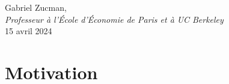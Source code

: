 \documentclass[a5paper,french,openany]{memoir}
\begin{document}
\begin{flushright}
Gabriel Zucman,\\
\textit{Professeur à l'École d'Économie de Paris et à UC Berkeley}\\
15 avril 2024
\end{flushright}

\chapter*{Motivation}\label{ch:intro}

\end{document}
